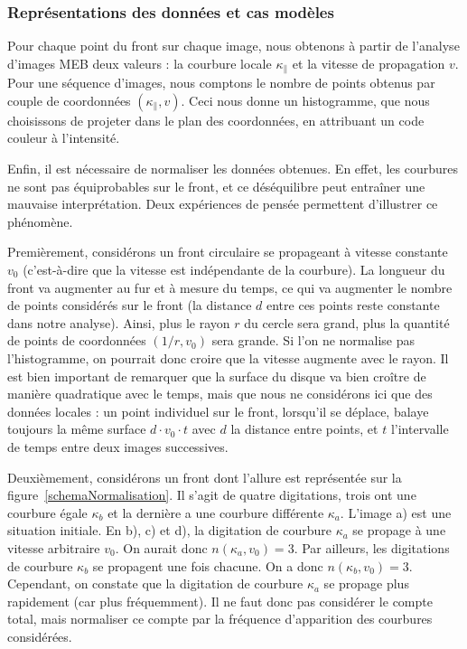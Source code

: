 			\subsubsection{Représentations des données et cas modèles}
Pour chaque point du front sur chaque image, nous obtenons à partir de l'analyse d'images MEB deux valeurs : la courbure locale $\kappa_\parallel$ et la vitesse de propagation $v$. Pour une séquence d'images, nous comptons le nombre de points obtenus par couple de coordonnées $(\kappa_\parallel,v)$. Ceci nous donne un histogramme, que nous choisissons de projeter dans le plan des coordonnées, en attribuant un code couleur à l'intensité.\par 
Enfin, il est nécessaire de normaliser les données obtenues. En effet, les courbures ne sont pas équiprobables sur le front, et ce déséquilibre peut entraîner une mauvaise interprétation. Deux expériences de pensée permettent d'illustrer ce phénomène.\par 
Premièrement, considérons un front circulaire se propageant à vitesse constante $v_0$ (c'est-à-dire que la vitesse est indépendante de la courbure). La longueur du front va augmenter au fur et à mesure du temps, ce qui va augmenter le nombre de points considérés sur le front (la distance $d$ entre ces points reste constante dans notre analyse). Ainsi, plus le rayon $r$ du cercle sera grand, plus la quantité de points de coordonnées $(1/r,v_0)$ sera grande. Si l'on ne normalise pas l'histogramme, on pourrait donc croire que la vitesse augmente avec le rayon. Il est bien important de remarquer que la surface du disque va bien croître de manière quadratique avec le temps, mais que nous ne considérons ici que des données locales : un point individuel sur le front, lorsqu'il se déplace, balaye toujours la même surface $d \cdot v_0 \cdot t$ avec $d$ la distance entre points, et $t$ l'intervalle de temps entre deux images successives.\par
Deuxièmement, considérons un front dont l'allure est représentée sur la figure~\ref{schemaNormalisation}. Il s'agit de quatre digitations, trois ont une courbure égale $\kappa_b$ et la dernière a une courbure différente $\kappa_a$. L'image a) est une situation initiale. En b), c) et d), la digitation de courbure $\kappa_a$ se propage à une vitesse arbitraire $v_0$. On aurait donc $n(\kappa_a,v_0)=3$. Par ailleurs, les digitations de courbure $\kappa_b$ se propagent une fois chacune. On a donc $n(\kappa_b,v_0)=3$. Cependant, on constate que la digitation de courbure $\kappa_a$ se propage plus rapidement (car plus fréquemment). Il ne faut donc pas considérer le compte total, mais normaliser ce compte par la fréquence d'apparition des courbures considérées.\par 
